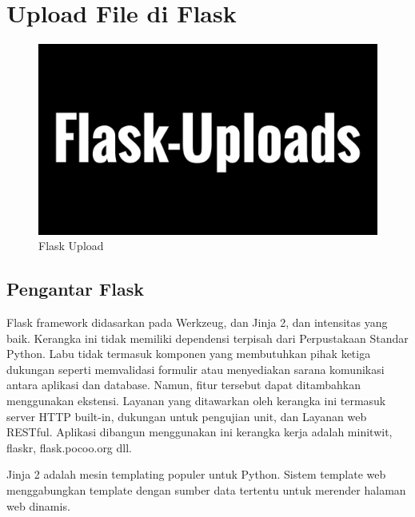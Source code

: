 


\section{Upload File di Flask}


\begin{figure}
\centerline{\includegraphics[width=1\textwidth]{figures/5flask-upload.png}}
\caption{Flask Upload}
\end{figure}

\subsection{Pengantar Flask}


Flask framework didasarkan pada Werkzeug, dan Jinja 2, dan intensitas yang baik. Kerangka ini tidak memiliki dependensi terpisah dari
Perpustakaan Standar Python. Labu tidak termasuk komponen yang membutuhkan pihak ketiga dukungan seperti memvalidasi formulir atau menyediakan sarana komunikasi antara aplikasi dan database. Namun, fitur tersebut dapat ditambahkan menggunakan ekstensi. Layanan yang ditawarkan oleh kerangka ini termasuk server HTTP built-in, dukungan untuk pengujian unit, dan Layanan web RESTful. Aplikasi dibangun menggunakan ini kerangka kerja adalah minitwit, flaskr, flask.pocoo.org dll.

Jinja 2 adalah mesin templating populer untuk Python. Sistem template web menggabungkan template dengan sumber data tertentu untuk merender halaman web dinamis.

